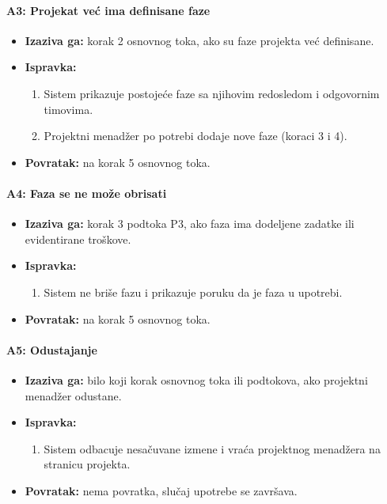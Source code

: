 \paragraph*{A3: Projekat već ima definisane faze}
\begin{itemize}
    \item \textbf{Izaziva ga:} korak 2 osnovnog toka, ako su faze projekta već definisane.
    \item \textbf{Ispravka:}
    \begin{enumerate}
        \item Sistem prikazuje postojeće faze sa njihovim redosledom i odgovornim timovima.
        \item Projektni menadžer po potrebi dodaje nove faze (koraci 3 i 4).
    \end{enumerate}
    \item \textbf{Povratak:} na korak 5 osnovnog toka.
\end{itemize}

\paragraph*{A4: Faza se ne može obrisati}
\begin{itemize}
    \item \textbf{Izaziva ga:} korak 3 podtoka P3, ako faza ima dodeljene zadatke ili evidentirane troškove.
    \item \textbf{Ispravka:}
    \begin{enumerate}
        \item Sistem ne briše fazu i prikazuje poruku da je faza u upotrebi.
    \end{enumerate}
    \item \textbf{Povratak:} na korak 5 osnovnog toka.
\end{itemize}

\paragraph*{A5: Odustajanje}
\begin{itemize}
    \item \textbf{Izaziva ga:} bilo koji korak osnovnog toka ili podtokova, ako projektni menadžer odustane.
    \item \textbf{Ispravka:}
    \begin{enumerate}
        \item Sistem odbacuje nesačuvane izmene i vraća projektnog menadžera na stranicu projekta.
    \end{enumerate}
    \item \textbf{Povratak:} nema povratka, slučaj upotrebe se završava.
\end{itemize}

